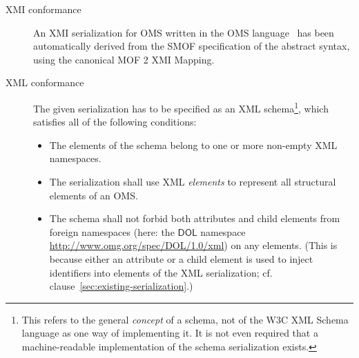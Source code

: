 \documentclass[10pt,fleqn,final]{scrreprt}
\makeatletter
\newcommand{\cbs}[0]{\color{red}\xspace} %
\newcommand{\cbe}[0]{\color{black}\xspace} %
\newcommand*{\eg}{e.g.\@\xspace}
\newcommand*\CommentAuthor{}
\renewcommand*\CommentAuthor{#1}}
\newcommand*\CommentDate{}
\renewcommand*\CommentDate{#1}}
\newcommand*\CommentId{}
\renewcommand*\CommentId{#1}}
\newcommand*\CommentType{}
\renewcommand*\CommentType{#1}}
\newcommand*{\SetCommentColorByType}[1]{%
\edef\localType{{#1}}%
\expandafter\ifstrequal\localType{q-aut}{\colorlet{CommentColor}{red}}{%
\expandafter\ifstrequal\localType{q-all}{\colorlet{CommentColor}{orange}}{%
\expandafter\ifstrequal\localType{todo}{\colorlet{CommentColor}{orange}}{%
\expandafter\ifstrequal\localType{fyi}{\colorlet{CommentColor}{lightgray}}{%
\colorlet{CommentColor}{yellow}}}}}}
\newcommand*{\SetCommentPrefixByType}[1]{%
\edef\localType{{#1}}%
\expandafter\@ifmtarg\localType{%
\edef\CommentPrefix{}%
}{%
\caseupper[q]{#1}%
\edef\CommentPrefix{\thestring: }%
}}
\newcommand*{\initComment}[1]{%
\setkeys{Comment}{#1}%
\SetCommentColorByType{\CommentType}%
\relax%
\SetCommentPrefixByType{\CommentType}%
\relax%
}
\newcommand*{\todonote}[2][]{%
\initComment{#1}%
\pdfcomment[author=\CommentAuthor,color=CommentColor,date=\CommentDate,id=\CommentId]{%
\CommentPrefix
#2}}
\renewcommand*{\todonote}[2][]{%
\initComment{#1}%
\ednote{\CommentPrefix #2}}
\newcommand*{\DOL}{\ensuremath{\mathsf{DOL}}\xspace}
\makeatother
\begin{document}
\begin{description}
\item[XMI conformance]
An XMI serialization \cbs for OMS written in the OMS language \cbe\ has been automatically derived from the SMOF specification
of the abstract syntax, using the canonical MOF 2 XMI Mapping.
\item[XML conformance]
The given serialization has to be specified as an XML schema\footnote{\cbs This refers \cbe to the general \emph{concept} of a schema, not of the W3C XML Schema language as one way of implementing it.  It is not even required that a machine-readable implementation of the schema serialization exists.}, which satisfies
 all of the following conditions:
\begin{itemize}
\item The elements of the schema belong to one or more non-empty XML
namespaces.%
\item The serialization shall use XML \emph{elements} to represent all structural elements of an OMS.
\item The schema shall not forbid both attributes and child elements from foreign namespaces (here: the
 \DOL namespace \url{http://www.omg.org/spec/DOL/1.0/xml}) on any elements. (This  is because either an attribute or a child element is used to inject identifiers into elements of the XML serialization; cf. clause~\ref{sec:existing-serialization}.)
\end{itemize}


\end{description}
\end{document}
